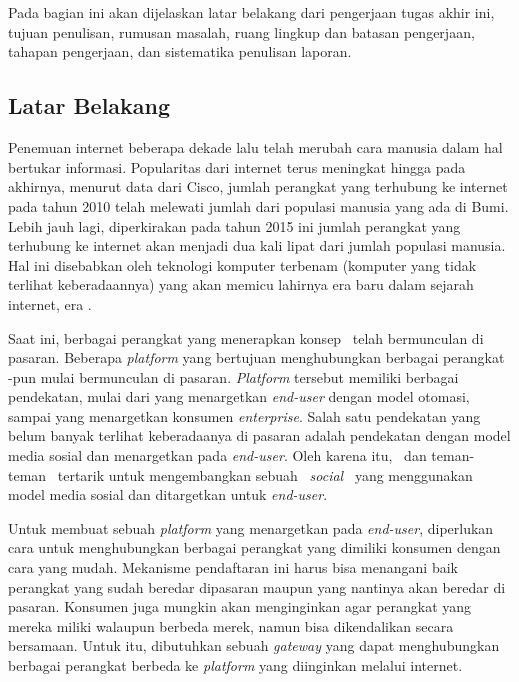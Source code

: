 \chapter{\babSatu}
Pada bagian ini akan dijelaskan latar belakang dari pengerjaan tugas akhir ini, tujuan penulisan, rumusan masalah, ruang lingkup dan batasan pengerjaan, tahapan pengerjaan, dan sistematika penulisan laporan.


\section{Latar Belakang}
Penemuan internet beberapa dekade lalu telah merubah cara manusia dalam hal bertukar informasi. Popularitas dari internet terus meningkat hingga pada akhirnya, menurut data dari Cisco\cite{CiscoIot}, jumlah perangkat yang terhubung ke internet pada tahun 2010 telah melewati jumlah dari populasi manusia yang ada di Bumi. Lebih jauh lagi, diperkirakan pada tahun 2015 ini jumlah perangkat yang terhubung ke internet akan menjadi dua kali lipat dari jumlah populasi manusia. Hal ini disebabkan oleh teknologi komputer terbenam (komputer yang tidak terlihat keberadaannya) yang akan memicu lahirnya era baru dalam sejarah internet, era \iot.

Saat ini, berbagai perangkat yang menerapkan konsep \iot~telah bermunculan di pasaran. Beberapa \textit{platform} yang bertujuan menghubungkan berbagai perangkat \iot-pun mulai bermunculan di pasaran. \textit{Platform} tersebut memiliki berbagai pendekatan, mulai dari yang menargetkan \textit{end-user} dengan model otomasi, sampai yang menargetkan konsumen \textit{enterprise}. Salah satu pendekatan yang belum banyak terlihat keberadaanya di pasaran adalah pendekatan dengan model media sosial dan menargetkan pada \textit{end-user}. Oleh karena itu, \saya~dan teman-teman \saya~tertarik untuk mengembangkan sebuah \plat~\textit{social} \iot~yang menggunakan model media sosial dan ditargetkan untuk \textit{end-user}.

Untuk membuat sebuah \textit{platform} yang menargetkan pada \textit{end-user}, diperlukan cara untuk menghubungkan berbagai perangkat yang dimiliki konsumen dengan cara yang mudah. Mekanisme pendaftaran ini harus bisa menangani baik perangkat yang sudah beredar dipasaran maupun yang nantinya akan beredar di pasaran. Konsumen juga mungkin akan menginginkan agar perangkat yang mereka miliki walaupun berbeda merek, namun bisa dikendalikan secara bersamaan. Untuk itu, dibutuhkan sebuah \textit{gateway} yang dapat menghubungkan berbagai perangkat berbeda ke \textit{platform} yang diinginkan melalui internet.

